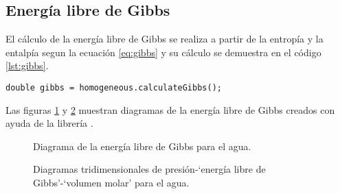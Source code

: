 \subsection{Energía libre de Gibbs}
	
	El cálculo de la energía libre de Gibbs se realiza a partir de la entropía y la entalpía segun la ecuación \ref{eq:gibbs} y su cálculo se demuestra en el código \ref{lst:gibbs}.

	\begin{lstlisting}[label={lst:gibbs},caption={Cálculo de la energía libre de Gibbs con la librería \Materia}]
		double gibbs = homogeneous.calculateGibbs();
	\end{lstlisting}

	Las figuras \ref{fig:2dgibbs} y \ref{fig:gibbs3d} muestran diagramas de la energía libre de Gibbs creados con ayuda de la librería \Materia.

\begin{figure}[!h]
	\centering	
	\caption{Diagrama de la energía libre de Gibbs para el agua.}\label{fig:2dgibbs}
\end{figure}

\begin{figure}[!h]
	\caption{Diagramas tridimensionales de presión-`energía libre de Gibbs'-`volumen molar' para el agua.}\label{fig:gibbs3d}
\end{figure}